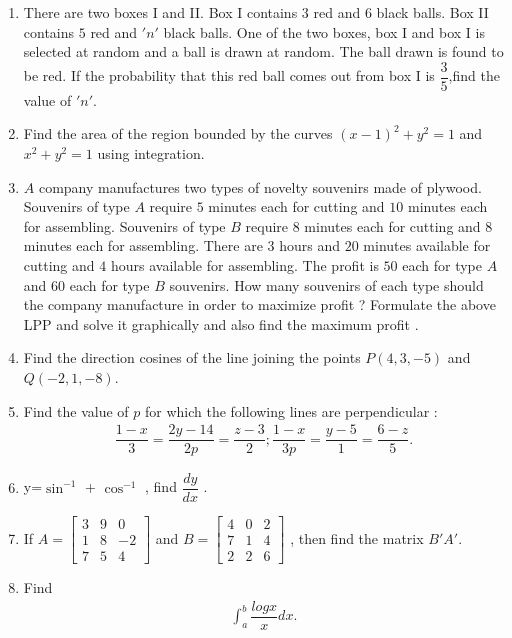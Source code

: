 \documentclass[12pt,-letter paper]{article}
\providecommand{\myvec}[1]{\ensuremath{\begin{bmatrix}#1\end{bmatrix}}}
\providecommand{\brak}[1]{\ensuremath{\left(#1\right)}}
\begin{document}
\begin{enumerate}
\item There are two boxes I and II. Box I contains $3$ red and $6$ black balls. Box II contains $5$ red and $'n'$ black balls. One of the two boxes, box I and box I is selected at random and a ball is drawn at random. The ball drawn is found to be red. If the probability that this red ball comes out from box I is $\dfrac{3}{5}$,find the value of $'n'$.

\item Find the area of the region bounded by the curves $\brak{x-1}^{2} +y^{2} = 1$ and $ x^{2}+y^{2}  = 1$ using integration.

\item $A$ company manufactures two types of novelty souvenirs made of plywood. Souvenirs of type $A$ require $5$ minutes each for cutting and $10$ minutes each for assembling. Souvenirs of type $B$ require $8$ minutes each for cutting and $8$ minutes each for assembling. There are $3$ hours and $20$ minutes available for cutting and $4$ hours available for  assembling. The profit is \rupee $50$ each for type $A$ and \rupee $60$  each for type $B$ souvenirs. How many souvenirs of each type should the company manufacture in order to maximize profit ? Formulate the above LPP and solve it graphically and also find the maximum profit .

\item Find the direction cosines of the line joining the points $P \brak{4, 3, -5}$ and $Q  \brak{-2, 1, -8}$.

\item Find the value of $p$ for which the following lines are perpendicular  :
\begin{align*}
\dfrac{1-x}{3}= \dfrac{2y-14}{2p} = \dfrac{z-3}{2}; \dfrac{1-x}{3p} = \dfrac{y-5}{1} = \dfrac{6-z}{5}.
\end{align*}

\item y=$\sin^{-1}$ + $\cos^{-1}$ , find $\dfrac{dy}{dx}$ .

\item If $A = \myvec{3&9&0\\1&8&-2\\7&5&4}$ and $B = \myvec{4&0&2\\7&1&4\\2&2&6}$ , then find the matrix $B'A'$.

\item Find
\begin{align*}
    \int_{a}^{b}\dfrac{log x}{x}dx.
\end{align*}


\end{enumerate}
\end{document}
